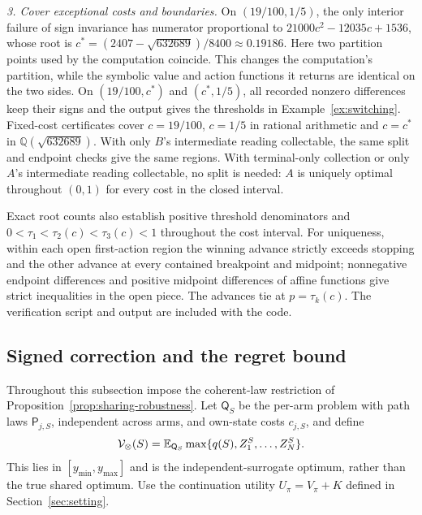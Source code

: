 \emph{3. Cover exceptional costs and boundaries.}
On $(19/100,1/5)$, the only interior failure of sign invariance has numerator
proportional to $21000c^2-12035c+1536$, whose root is
$c^\ast=(2407-\sqrt{632689})/8400\approx0.19186$.
Here two partition points used by the computation coincide. This changes the
computation's partition, while the symbolic value and action functions it returns
are identical on the two sides. On $(19/100,c^\ast)$ and $(c^\ast,1/5)$,
all recorded nonzero differences keep their signs and the output gives the
thresholds in Example~\ref{ex:switching}. Fixed-cost certificates cover
$c=19/100$, $c=1/5$ in rational arithmetic and $c=c^\ast$ in
$\mathbb Q(\sqrt{632689})$.
With only $B$'s intermediate reading collectable, the same split and endpoint
checks give the same regions. With terminal-only collection or only $A$'s
intermediate reading collectable, no split is needed: $A$ is uniquely optimal
throughout $(0,1)$ for every cost in the closed interval.

Exact root counts also establish positive threshold denominators and
$0<\tau_1<\tau_2(c)<\tau_3(c)<1$ throughout the cost interval.
For uniqueness, within each open first-action region the winning advance strictly
exceeds stopping and the other advance at every contained breakpoint and midpoint;
nonnegative endpoint differences and positive midpoint differences of affine
functions give strict inequalities in the open piece. The advances tie at
$p=\tau_k(c)$. The verification script and output are included with the code.

\subsection{Signed correction and the regret bound}
\label{app:sharing-robustness}

Throughout this subsection impose the coherent-law restriction of
Proposition~\ref{prop:sharing-robustness}. Let $\mathsf Q_S$ be the per-arm problem with path
laws $\mathsf P_{j,S}$, independent across arms, and own-state costs $c_{j,S}$, and define
\[
 \mathcal V_\otimes(S)=\mathbb{E}_{\mathsf Q_S}\max\{q(S),Z_1^S,\ldots,Z_N^S\}.
\]
This lies in $[y_{\min},y_{\max}]$ and is the independent-surrogate optimum,
rather than the true shared optimum. Use the continuation utility
$U_\pi=V_\pi+K$ defined in Section~\ref{sec:setting}.

